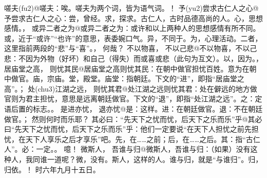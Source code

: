 \documentclass[a4paper]{article}
\begin{document}
嗟夫(fu2)@{嗟夫：唉。嗟夫为两个词，皆为语气词。}！
予(yu2)尝求古仁人之心@{予尝求古仁人之心：尝，曾经。求，探求。古仁人，古时品德高尚的人。心，思想感情。}，
或异二者之为@{或异二者之为：或许和以上两种人的思想感情有所不同。或，近于“或许”“也许”的意思，表委婉口气。异，不同于。为，心理活动。二者，这里指前两段的“悲”与“喜”。}，
何哉？
不以物喜，
不以己悲@{不以物喜，不以己悲：不因为外物（好坏）和自己（得失）而或喜或悲（此句为互文）。以，因为。}，
居庙堂之高，
则忧其民@{居庙堂之高则忧其民：在朝中做官担忧百姓。意为在朝中做官。庙，宗庙。堂，殿堂。庙堂：指朝廷。下文的“进”，即指“居庙堂之高”。}；
处(chu3)江湖之远，
则忧其君@{处江湖之远则忧其君：处在僻远的地方做官则为君主担忧，意思是远离朝廷做官。下文的“退”，即指“处江湖之远”。之：定语后置的标志。}。
是进亦忧，
退亦忧@{是：这样。进：在朝廷做官。退：不在朝廷做官。}；
然则何时而乐耶？
其必曰：“先天下之忧而忧，后天下之乐而乐”乎@{其必曰“先天下之忧而忧，后天下之乐而乐”乎：他们一定要说“在天下人担忧之前先担忧，在天下人享乐之后才享乐”吧。先，在……之前；后，在……之后。其：指“古仁人”。必：一定。}。
噫！
微斯人，
吾谁与归@{微斯人，吾谁与归：（如果）没有这种人，我同谁一道呢？微，没有。斯人，这样的人。谁与归，就是“与谁归”。归，归依。}！
时六年九月十五日。

\end{document}
